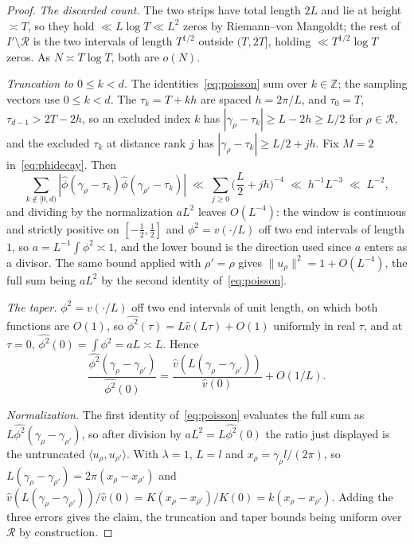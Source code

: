 \documentclass[11pt]{article}
\theoremstyle{definition}
\newcommand{\Z}{\mathbb{Z}}
\newcommand{\cR}{\mathcal{R}}
\begin{document}
\begin{proof}
\emph{The discarded count.} The two strips have total length $2L$ and lie at
height $\asymp T$, so they hold $\ll L\log T\ll L^2$ zeros by
Riemann--von Mangoldt; the rest of $I'\setminus\cR$ is the two intervals of
length $T^{1/2}$ outside $(T,2T]$, holding $\ll T^{1/2}\log T$ zeros. As
$N\asymp T\log T$, both are $o(N)$.

\emph{Truncation to $0\le k<d$.} The identities~\eqref{eq:poisson} sum over
$k\in\Z$; the sampling vectors use $0\le k<d$. The $\tau_k=T+kh$ are spaced
$h=2\pi/L$, and $\tau_0=T$, $\tau_{d-1}>2T-2h$, so an excluded index $k$ has
$|\gamma_\rho-\tau_k|\ge L-2h\ge L/2$ for $\rho\in\cR$, and the excluded
$\tau_k$ at distance rank $j$ has $|\gamma_\rho-\tau_k|\ge L/2+jh$. Fix $M=2$
in~\eqref{eq:phidecay}. Then
\[
  \sum_{k\notin[0,d)}|\widehat\phi(\gamma_\rho-\tau_k)\widehat\phi(\gamma_{\rho'}-\tau_k)|
  \;\ll\;\sum_{j\ge0}\Big(\frac L2+jh\Big)^{-4}
  \;\ll\;h^{-1}L^{-3}\;\ll\;L^{-2},
\]
and dividing by the normalization $aL^2$ leaves $O(L^{-4})$: the window is
continuous and strictly positive on $[-\tfrac12,\tfrac12]$ and
$\phi^2=v(\cdot/L)$ off two end intervals of length $1$, so
$a=L^{-1}\!\int\phi^2\asymp1$, and the lower bound is the direction used since
$a$ enters as a divisor. The same bound applied with $\rho'=\rho$ gives
$\|u_\rho\|^2=1+O(L^{-4})$, the full sum being $aL^2$ by the second identity
of~\eqref{eq:poisson}.

\emph{The taper.} $\phi^2=v(\cdot/L)$ off two end intervals of unit length, on
which both functions are $O(1)$, so
$\widehat{\phi^2}(\tau)=L\widehat v(L\tau)+O(1)$ uniformly in real $\tau$, and
at $\tau=0$, $\widehat{\phi^2}(0)=\int\phi^2=aL\asymp L$. Hence
\[
  \frac{\widehat{\phi^2}(\gamma_\rho-\gamma_{\rho'})}{\widehat{\phi^2}(0)}
  =\frac{\widehat v(L(\gamma_\rho-\gamma_{\rho'}))}{\widehat v(0)}+O(1/L).
\]

\emph{Normalization.} The first identity of~\eqref{eq:poisson} evaluates the
full sum as $L\widehat{\phi^2}(\gamma_\rho-\gamma_{\rho'})$, so after division
by $aL^2=L\widehat{\phi^2}(0)$ the ratio just displayed is the untruncated
$\langle u_\rho,u_{\rho'}\rangle$. With $\lambda=1$, $L=l$ and
$x_\rho=\gamma_\rho l/(2\pi)$, so
$L(\gamma_\rho-\gamma_{\rho'})=2\pi(x_\rho-x_{\rho'})$ and
$\widehat v(L(\gamma_\rho-\gamma_{\rho'}))/\widehat v(0)=K(x_\rho-x_{\rho'})/K(0)
=k(x_\rho-x_{\rho'})$. Adding the three errors gives the claim, the truncation
and taper bounds being uniform over $\cR$ by construction.
\end{proof}
\end{document}
